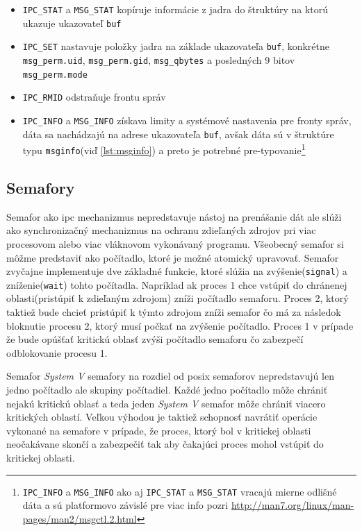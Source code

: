 \begin{itemize}
\item \texttt{IPC\_STAT} a \texttt{MSG\_STAT} kopíruje informácie z jadra do štruktúry na ktorú ukazuje ukazovateľ \texttt{buf}
\item \texttt{IPC\_SET} nastavuje položky jadra na základe ukazovateľa \texttt{buf}, konkrétne \texttt{msg\_perm.uid}, \texttt{msg\_perm.gid}, \texttt{msg\_qbytes} a posledných 9 bitov \texttt{msg\_perm.mode}
\item \texttt{IPC\_RMID} odstraňuje frontu správ
\item \texttt{IPC\_INFO} a \texttt{MSG\_INFO} získava limity a systémové nastavenia pre fronty správ, dáta sa nachádzajú na adrese ukazovateľa \texttt{buf}, avšak dáta sú v štruktúre typu \texttt{msginfo}(viď \ref{lst:msginfo}) a preto je potrebné pre-typovanie\footnote{\texttt{IPC\_INFO} a \texttt{MSG\_INFO} ako aj \texttt{IPC\_STAT} a \texttt{MSG\_STAT} vracajú mierne odlišné dáta a sú platformovo závislé pre viac info pozri \url{http://man7.org/linux/man-pages/man2/msgctl.2.html}}
\end{itemize}
\subsection{Semafory}
Semafor ako \acrshort{ipc} mechanizmus nepredstavuje nástoj na prenášanie dát ale slúži ako synchronizačný mechanizmus na ochranu zdieľaných zdrojov pri viac procesovom alebo viac vláknovom vykonávaný programu. Všeobecný semafor si môžme predstaviť ako počítadlo, ktoré je možné atomický upravovať. Semafor zvyčajne implementuje dve základné funkcie, ktoré slúžia na zvýšenie(\texttt{signal}) a zníženie(\texttt{wait}) tohto počítadla. Napríklad ak proces 1 chce vstúpiť do chránenej oblasti(pristúpiť k zdieľaným zdrojom) zníži počítadlo semaforu. Proces 2, ktorý taktiež bude chcieť pristúpiť k týmto zdrojom zníži semafor čo má za následok bloknutie procesu 2, ktorý musí počkať na zvýšenie počítadlo. Proces 1 v prípade že bude opúšťať kritickú oblasť zvýši počítadlo semaforu čo zabezpečí odblokovanie procesu 1.

Semafor \textit{System V} semafory na rozdiel od \acrshort{posix} semaforov nepredstavujú len jedno počítadlo ale skupiny počítadiel. Každé jedno počítadlo môže chrániť nejakú kritickú oblasť a teda jeden \textit{System V} semafor môže chrániť viacero kritických oblastí. Veľkou výhodou je taktiež schopnosť navrátiť operácie vykonané na semafore v prípade, že proces, ktorý bol v kritickej oblasti neočakávane skončí a zabezpečiť tak aby čakajúci proces mohol vstúpiť do kritickej oblasti. 

